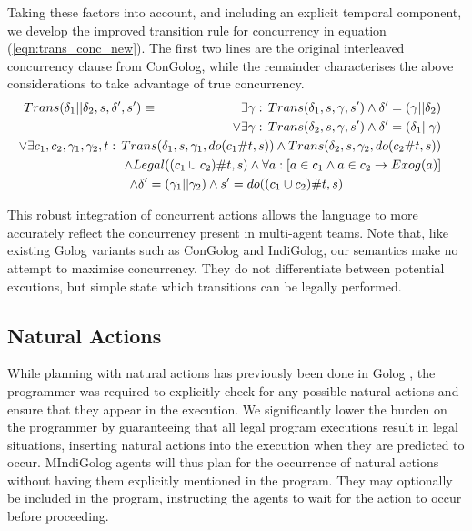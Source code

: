 Taking these factors into account, and including an explicit temporal
component, we develop the improved transition rule for concurrency
in equation (\ref{eqn:trans_conc_new}). The first two lines are the
original interleaved concurrency clause from ConGolog, while the remainder
characterises the above considerations to take advantage of true concurrency.\begin{multline}
Trans(\delta_{1}||\delta_{2},s,\delta',s')\equiv\,\,\,\,\,\,\,\,\,\,\,\,\,\,\,\,\,\,\,\,\,\,\,\,\,\,\,\,\,\,\,\,\,\,\,\,\,\,\,\shoveright{\exists\gamma:\, Trans(\delta_{1},s,\gamma,s')\wedge\delta'=(\gamma||\delta_{2})}\\
\shoveright{\vee\exists\gamma:\, Trans(\delta_{2},s,\gamma,s')\wedge\delta'=(\delta_{1}||\gamma)}\\
\shoveright{\vee\exists c_{1},c_{2},\gamma_{1},\gamma_{2},t:\, Trans(\delta_{1},s,\gamma_{1},do(c_{1}\#t,s))\wedge Trans(\delta_{2},s,\gamma_{2},do(c_{2}\#t,s))}\\
\shoveright{\wedge Legal((c_{1}\cup c_{2})\#t,s)\wedge\forall a:\left[a\in c_{1}\wedge a\in c_{2}\rightarrow Exog(a)\right]}\\
\wedge\delta'=(\gamma_{1}||\gamma_{2})\wedge s'=do((c_{1}\cup c_{2})\#t,s)\label{eqn:trans_conc_new}\end{multline}


This robust integration of concurrent actions allows the language
to more accurately reflect the concurrency present in multi-agent
teams. Note that, like existing Golog variants such as ConGolog and
IndiGolog, our semantics make no attempt to maximise concurrency.
They do not differentiate between potential excutions, but simple
state which transitions can be legally performed.


\subsection{Natural Actions}

While planning with natural actions has previously been done in Golog
\citep{pirri00planning_nat_acts}, the programmer was required to
explicitly check for any possible natural actions and ensure that
they appear in the execution. We significantly lower the burden on
the programmer by guaranteeing that all legal program executions result
in legal situations, inserting natural actions into the execution
when they are predicted to occur. MIndiGolog agents will thus plan
for the occurrence of natural actions without having them explicitly
mentioned in the program. They may optionally be included in the program,
instructing the agents to wait for the action to occur before proceeding.


